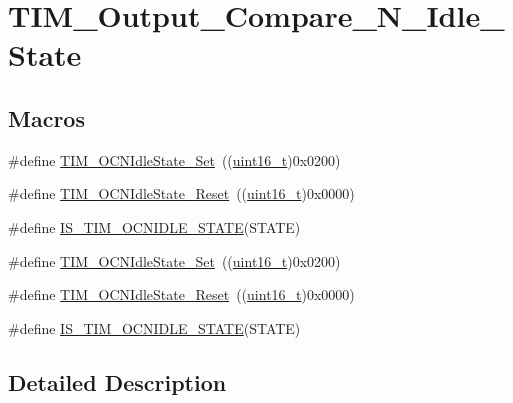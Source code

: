 \hypertarget{group___t_i_m___output___compare___n___idle___state}{}\section{T\+I\+M\+\_\+\+Output\+\_\+\+Compare\+\_\+\+N\+\_\+\+Idle\+\_\+\+State}
\label{group___t_i_m___output___compare___n___idle___state}
\subsection*{Macros}
\begin{DoxyCompactItemize}
\item 
\#define \hyperlink{group___t_i_m___output___compare___n___idle___state_ga980392da6eb5bedcbf7ed353e1073f99}{T\+I\+M\+\_\+\+O\+C\+N\+Idle\+State\+\_\+\+Set}~((\hyperlink{_p_e___types_8h_a1f1825b69244eb3ad2c7165ddc99c956}{uint16\+\_\+t})0x0200)
\item 
\#define \hyperlink{group___t_i_m___output___compare___n___idle___state_ga329a32820cdba0af9c4b7a04177e8fdd}{T\+I\+M\+\_\+\+O\+C\+N\+Idle\+State\+\_\+\+Reset}~((\hyperlink{_p_e___types_8h_a1f1825b69244eb3ad2c7165ddc99c956}{uint16\+\_\+t})0x0000)
\item 
\#define \hyperlink{group___t_i_m___output___compare___n___idle___state_ga0987091d1d03ba2db065efb66eff3951}{I\+S\+\_\+\+T\+I\+M\+\_\+\+O\+C\+N\+I\+D\+L\+E\+\_\+\+S\+T\+A\+TE}(S\+T\+A\+TE)
\item 
\#define \hyperlink{group___t_i_m___output___compare___n___idle___state_ga980392da6eb5bedcbf7ed353e1073f99}{T\+I\+M\+\_\+\+O\+C\+N\+Idle\+State\+\_\+\+Set}~((\hyperlink{_p_e___types_8h_a1f1825b69244eb3ad2c7165ddc99c956}{uint16\+\_\+t})0x0200)
\item 
\#define \hyperlink{group___t_i_m___output___compare___n___idle___state_ga329a32820cdba0af9c4b7a04177e8fdd}{T\+I\+M\+\_\+\+O\+C\+N\+Idle\+State\+\_\+\+Reset}~((\hyperlink{_p_e___types_8h_a1f1825b69244eb3ad2c7165ddc99c956}{uint16\+\_\+t})0x0000)
\item 
\#define \hyperlink{group___t_i_m___output___compare___n___idle___state_ga0987091d1d03ba2db065efb66eff3951}{I\+S\+\_\+\+T\+I\+M\+\_\+\+O\+C\+N\+I\+D\+L\+E\+\_\+\+S\+T\+A\+TE}(S\+T\+A\+TE)
\end{DoxyCompactItemize}


\subsection{Detailed Description}


